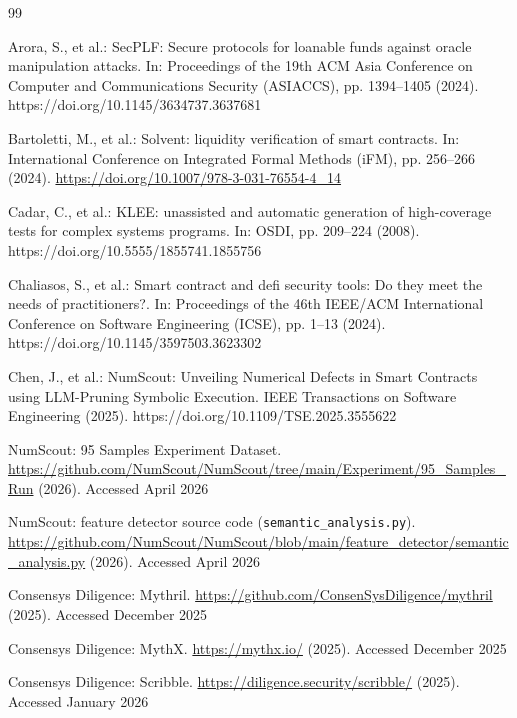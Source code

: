 \documentclass[pdflatex,sn-basic]{sn-jnl}%
\theoremstyle{thmstyleone}%
\theoremstyle{thmstyletwo}%
\theoremstyle{thmstylethree}%
\begin{document}
\begin{thebibliography}{99}

Arora, S., et al.: SecPLF: Secure protocols for loanable funds against oracle manipulation attacks. In: Proceedings of the 19th ACM Asia Conference on Computer and Communications Security (ASIACCS), pp. 1394--1405 (2024). https://doi.org/10.1145/3634737.3637681

Bartoletti, M., et al.: Solvent: liquidity verification of smart contracts. In: International Conference on Integrated Formal Methods (iFM), pp. 256--266 (2024). \url{https://doi.org/10.1007/978-3-031-76554-4_14}

Cadar, C., et al.: KLEE: unassisted and automatic generation of high-coverage tests for complex systems programs. In: OSDI, pp. 209--224 (2008). https://doi.org/10.5555/1855741.1855756

Chaliasos, S., et al.: Smart contract and defi security tools: Do they meet the needs of practitioners?. In: Proceedings of the 46th IEEE/ACM International Conference on Software Engineering (ICSE), pp. 1--13 (2024). https://doi.org/10.1145/3597503.3623302

Chen, J., et al.: NumScout: Unveiling Numerical Defects in Smart Contracts using LLM-Pruning Symbolic Execution. IEEE Transactions on Software Engineering (2025). https://doi.org/10.1109/TSE.2025.3555622

NumScout: 95 Samples Experiment Dataset. \url{https://github.com/NumScout/NumScout/tree/main/Experiment/95_Samples_Run} (2026). Accessed April 2026

NumScout: feature detector source code (\texttt{semantic\_analysis.py}). \url{https://github.com/NumScout/NumScout/blob/main/feature_detector/semantic_analysis.py} (2026). Accessed April 2026

Consensys Diligence: Mythril. \url{https://github.com/ConsenSysDiligence/mythril} (2025). Accessed December 2025

Consensys Diligence: MythX. \url{https://mythx.io/} (2025). Accessed December 2025

Consensys Diligence: Scribble. \url{https://diligence.security/scribble/} (2025). Accessed January 2026


\end{thebibliography}
\end{document}
